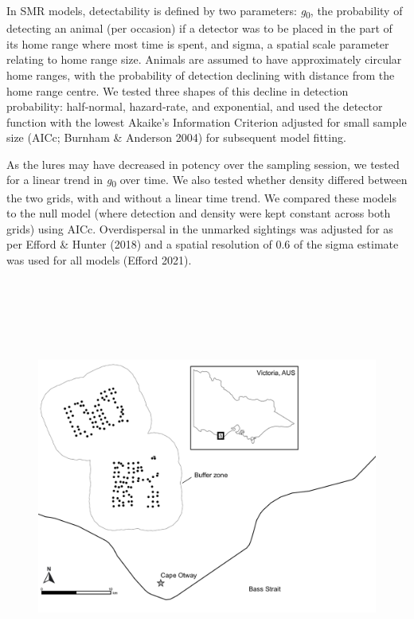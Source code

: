 \documentclass[11pt,a4paper,titlepage,twoside,openright]{style/unimelbthesis}
\begin{document}
\begin{mainmatter}
In SMR models, detectability is defined by two parameters: \emph{g}\textsubscript{0}, the probability of detecting an animal (per occasion) if a detector was to be placed in the part of its home range where most time is spent, and sigma, a spatial scale parameter relating to home range size. Animals are assumed to have approximately circular home ranges, with the probability of detection declining with distance from the home range centre. We tested three shapes of this decline in detection probability: half‐normal, hazard‐rate, and exponential, and used the detector function with the lowest Akaike's Information Criterion adjusted for small sample size (AICc; Burnham \& Anderson 2004) for subsequent model fitting.

As the lures may have decreased in potency over the sampling session, we tested for a linear trend in \emph{g}\textsubscript{0} over time. We also tested whether density differed between the two grids, with and without a linear time trend. We compared these models to the null model (where detection and density were kept constant across both grids) using AICc. Overdispersal in the unmarked sightings was adjusted for as per Efford \& Hunter (2018) and a spatial resolution of 0.6 of the sigma estimate was used for all models (Efford 2021).

\newpage

\(~\)

\(~\)

\(~\)
\begin{figure}

\hfill{}\includegraphics[width=1\linewidth]{figure/otways17_map} 


\end{figure}
\end{mainmatter}
\end{document}
